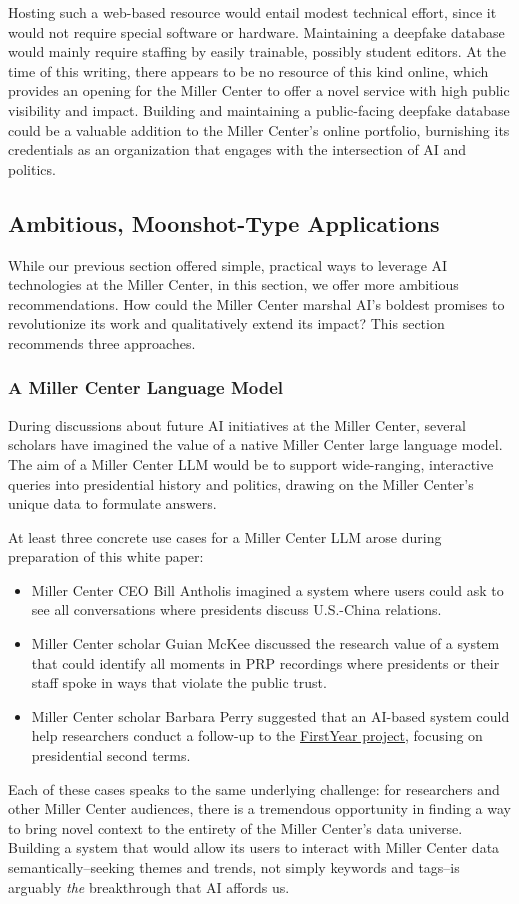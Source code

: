 \documentclass[12pt, oneside]{article}   	%
\begin{document}
Hosting such a web-based resource would entail modest technical effort, since it would not require special software or hardware.  Maintaining a deepfake database would mainly require staffing by easily trainable, possibly student editors.  At the time of this writing, there appears to be no resource of this kind online, which provides an opening for the Miller Center to offer a novel service with high public visibility and impact.  Building and maintaining a public-facing deepfake database could be a valuable addition to the Miller Center’s online portfolio, burnishing its credentials as an organization that engages with the intersection of AI and politics.


\subsection{Ambitious, Moonshot-Type Applications}\label{section.applications.hard}
While our previous section offered simple, practical ways to leverage AI technologies at the Miller Center, in this section, we offer more ambitious recommendations.  How could the Miller Center marshal AI’s boldest promises to revolutionize its work and qualitatively extend its impact?  This section recommends three approaches.


\subsubsection{A Miller Center Language Model}\label{section.applications.hard.mcllm}
During discussions about future AI initiatives at the Miller Center, several scholars have imagined the value of a native Miller Center large language model.  The aim of a Miller Center LLM would be to support wide-ranging, interactive queries into presidential history and politics, drawing on the Miller Center's unique data to formulate answers.

At least three concrete use cases for a Miller Center LLM arose during preparation of this white paper:
\begin{itemize}
\item Miller Center CEO Bill Antholis imagined a system where users could ask to see all conversations where presidents discuss U.S.-China relations. 
\item Miller Center scholar Guian McKee discussed the research value of a system that could identify all moments in PRP recordings where presidents or their staff spoke in ways that violate the public trust.  
\item Miller Center scholar Barbara Perry suggested that an AI-based system could help researchers conduct a follow-up to the \href{firstyear2017.org}{FirstYear project}, focusing on presidential second terms.
\end{itemize}
Each of these cases speaks to the same underlying challenge: for researchers and other Miller Center audiences, there is a tremendous opportunity in finding a way to bring novel context to  the entirety of the Miller Center's data universe.  Building a system that would allow its users to interact with Miller Center data semantically--seeking themes and trends, not simply keywords and tags--is arguably \emph{the} breakthrough that AI affords us.
\end{document}
